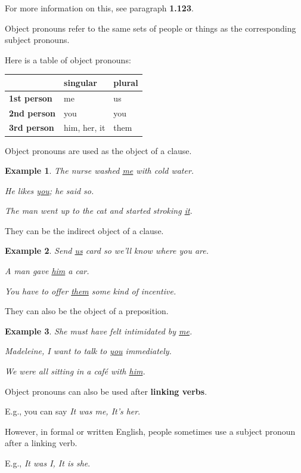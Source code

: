 \documentclass[oneside]{book}
\numberwithin{equation}{section}
\newtheorem{example}{Example}[section]
\begin{document}
For more information on this, see paragraph \textbf{1.123}.

%
\noindent{} Object pronouns refer to the same sets of people or things as the corresponding subject pronouns.

%
Here is a table of object pronouns:
\begin{table}[H]
    \centering
    \begin{tabular}{|l|l|l|}
        \hline
        & \textbf{singular} & \textbf{plural} \\
        \hline
        \textbf{1st person} & me & us \\
        \hline
        \textbf{2nd person} & you & you \\
        \hline
        \textbf{3rd person} & him, her, it & them \\
        \hline
    \end{tabular}
\end{table}
%
\noindent{} Object pronouns are used as the object of a clause.
\begin{example}
    The nurse washed \underline{me} with cold water.
    
    He likes \underline{you}; he said so.
    
    The man went up to the cat and started stroking \underline{it}.
\end{example}
They can be the indirect object of a clause.
\begin{example}
    Send \underline{us} card so we'll know where you are.
    
    A man gave \underline{him} a car.
    
    You have to offer \underline{them} some kind of incentive.
\end{example}
They can also be the object of a preposition.
\begin{example}
    She must have felt intimidated by \underline{me}.
    
    Madeleine, I want to talk to \underline{you} immediately.
    
    We were all sitting in a caf\'e with \underline{him}.
\end{example}
%
\noindent{} Object pronouns can also be used after \textbf{linking verbs}.

E.g., you can say \textit{It was me, It's her}.

However, in formal or written English, people sometimes use a subject pronoun after a linking verb.

E.g., \textit{It was I, It is she}.
\end{document}
